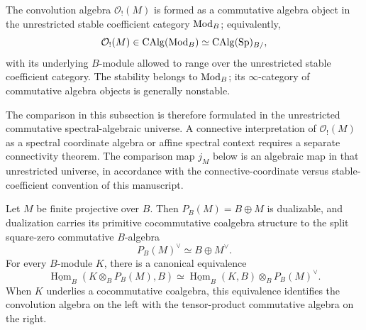 \begin{remark}
\label{rem:cofree-function-algebra-not-connective}
The convolution algebra \(\mathcal O_!(M)\) is formed as a commutative
algebra object in the unrestricted stable coefficient category
\(\operatorname{Mod}_B\); equivalently,
\[
    \mathcal O_!(M)
    \in
    \operatorname{CAlg}(\operatorname{Mod}_B)
    \simeq
    \operatorname{CAlg}(\operatorname{Sp})_{B/},
\]
with its underlying \(B\)-module allowed to range over the unrestricted
stable coefficient category. The stability belongs to \(\operatorname{Mod}_B\); its
\(\infty\)-category of commutative algebra objects is generally nonstable.

The comparison in this subsection is therefore formulated in the unrestricted
commutative spectral-algebraic universe. A connective interpretation of
\(\mathcal O_!(M)\) as a spectral coordinate algebra or affine spectral
context requires a separate connectivity theorem. The comparison map \(j_M\)
below is an algebraic map in that unrestricted universe, in accordance with
the connective-coordinate versus stable-coefficient convention of this
manuscript.
\end{remark}

\begin{lemma}
\label{lem:dual-primitive-square-zero}
Let \(M\) be finite projective over \(B\). Then \(P_B(M)=B\oplus M\) is
dualizable, and dualization carries its primitive cocommutative coalgebra
structure to the split square-zero commutative \(B\)-algebra
\[
    P_B(M)^\vee
    \simeq
    B\oplus M^\vee.
\]
For every \(B\)-module \(K\), there is a canonical equivalence
\[
    \underline{\operatorname{Hom}}_B(K\otimes_BP_B(M),B)
    \simeq
    \underline{\operatorname{Hom}}_B(K,B)
    \otimes_BP_B(M)^\vee.
\]
When \(K\) underlies a cocommutative coalgebra, this equivalence identifies the
convolution algebra on the left with the tensor-product commutative algebra on
the right.
\end{lemma}

